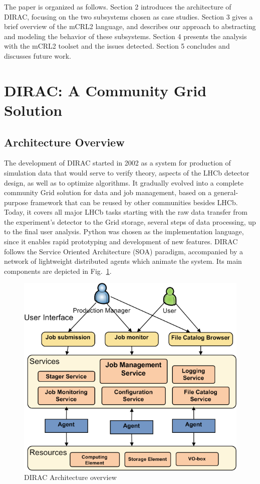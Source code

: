 \documentclass[10pt,conference]{IEEEtran}
\begin{document}
The paper is organized as follows. Section 2 introduces the architecture
of DIRAC, focusing on the two subsystems chosen as case studies. Section 3 gives a brief
overview of the mCRL2 language, and describes our approach to abstracting
and modeling the behavior of these subsystems. Section 4 presents the
analysis with the mCRL2 toolset and the issues detected. Section 5
concludes and discusses future work. 

\section{DIRAC: A Community Grid Solution}
\label{sec:Section_2}
\subsection{Architecture Overview}

The development of DIRAC started in 2002 as a system for production of simulation
data that would serve to verify theory, aspects of the LHCb detector design, as
well as to optimize algorithms. It gradually evolved into a complete community
Grid solution for data and job management, based on a general-purpose framework
that can be reused by other communities besides LHCb. Today, it covers all major
LHCb tasks starting with the raw data transfer from the experiment’s detector to
the Grid storage, several steps of data processing, up to the final user
analysis. Python was chosen as the implementation language, since it enables
rapid prototyping and development of new features. DIRAC follows the Service
Oriented Architecture (SOA) paradigm, accompanied by a network of lightweight
distributed agents which animate the system. Its main components are depicted in
Fig.~\ref{fig:DIRAC-Arch}. 

\begin{figure}[t]
\includegraphics[width=0.85\linewidth,keepaspectratio=true]{./DIRAC_Architecture.png}
\centering
\caption{DIRAC Architecture overview}
\label{fig:DIRAC-Arch}
\end{figure}
\end{document}
